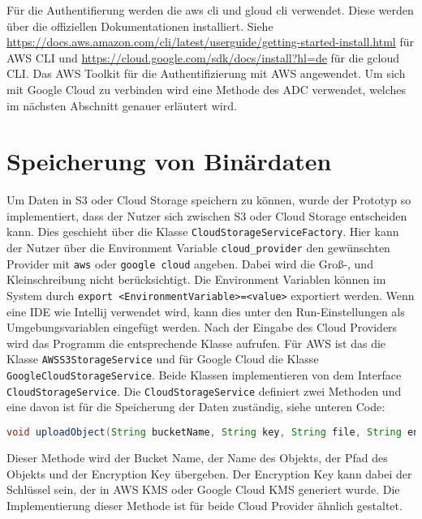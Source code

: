 Für die Authentifierung werden die aws cli und gloud cli verwendet. Diese werden über die offiziellen Dokumentationen installiert. Siehe \url{https://docs.aws.amazon.com/cli/latest/userguide/getting-started-install.html} für AWS CLI und  \url{https://cloud.google.com/sdk/docs/install?hl=de} für die gcloud CLI.  Das AWS Toolkit für die Authentifizierung mit AWS angewendet. Um sich mit Google Cloud zu verbinden wird eine Methode des ADC verwendet, welches im nächsten Abschnitt genauer erläutert wird.

\newpage

\section{Speicherung von Binärdaten}

Um Daten in S3 oder Cloud Storage speichern zu können, wurde der Prototyp so implementiert, dass der Nutzer sich zwischen S3 oder Cloud Storage entscheiden kann. Dies geschieht über die Klasse \verb|CloudStorageServiceFactory|. Hier kann der Nutzer über die Environment Variable \verb|cloud_provider| den gewünschten Provider mit \verb|aws| oder \verb|google cloud| angeben. Dabei wird die Groß-, und Kleinschreibung nicht berücksichtigt. Die Environment Variablen können im System durch \verb|export <EnvironmentVariable>=<value>| exportiert werden. Wenn eine IDE wie Intellij verwendet wird, kann dies unter den Run-Einstellungen als Umgebungsvariablen eingefügt werden. Nach der Eingabe des Cloud Providers wird das Programm die entsprechende Klasse aufrufen. Für AWS ist das die Klasse \verb|AWSS3StorageService| und für Google Cloud die Klasse \verb|GoogleCloudStorageService|. Beide Klassen implementieren von dem Interface \verb|CloudStorageService|. Die \verb|CloudStorageService| definiert zwei Methoden und eine davon ist für die Speicherung der Daten zuständig, siehe unteren Code:

\begin{lstlisting}[language=Java]
void uploadObject(String bucketName, String key, String file, String encryptionKey) throws IOException;
\end{lstlisting}
	

Dieser Methode wird der Bucket Name, der Name des Objekts, der Pfad des Objekts und der Encryption Key übergeben. Der Encryption Key kann dabei der Schlüssel sein, der in AWS KMS oder Google Cloud KMS generiert wurde. Die Implementierung dieser Methode ist für beide Cloud Provider ähnlich gestaltet.

